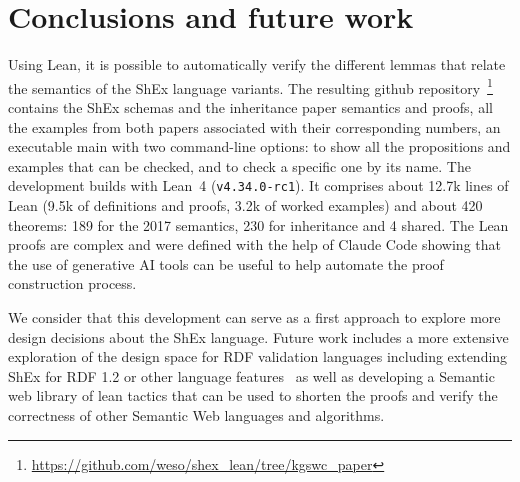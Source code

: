 \section{Conclusions and future work} \label{sec:conclusions}

Using Lean, it is possible to automatically verify the different 
lemmas that relate the semantics of the ShEx language variants. 
The resulting github repository~\footnote{\url{https://github.com/weso/shex_lean/tree/kgswc_paper}}
contains the ShEx schemas and the inheritance paper semantics and proofs,
all the examples from both papers associated with their corresponding numbers, 
an executable main with two command-line options: 
 to show all 
 the propositions and examples that can be checked, 
 and 
 to check a specific one by its name.
The development builds with Lean~4 (\texttt{v4.34.0-rc1}). 
It comprises about 12.7k lines of Lean (9.5k of definitions and proofs,
3.2k of worked examples) and about 420 theorems: 189 for the 2017
semantics, 230 for inheritance and 4 shared.
The Lean proofs are complex and were defined with the help of 
 Claude Code showing that the use of generative AI tools can be useful 
 to help automate the proof construction process.

We consider that this development can serve as a first approach to explore 
  more design decisions about the ShEx language. 
Future work includes a more extensive exploration of the 
 design space for RDF validation languages including extending ShEx 
 for RDF 1.2 or other language features~\cite{L24} as well as developing 
  a Semantic web library of lean tactics that can be used to shorten the proofs and 
  verify the correctness of other Semantic Web languages and algorithms. 



